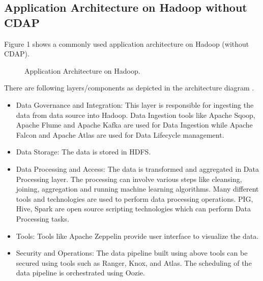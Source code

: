 \documentclass[9pt,twocolumn,twoside]{../../styles/osajnl}
\begin{document}
\subsection{Application Architecture on Hadoop without CDAP}
Figure 1 \cite{www-hdp-dataplatform} shows a commonly used application
architecture on Hadoop (without CDAP).


\begin{figure}[htbp]
\centering
{}
\caption{Application Architecture on Hadoop.}
\label{fig:hadoop-arch}
\end{figure}

There are following layers/components as depicted in the architecture diagram
\cite{www-hdp-dataplatform}.

\begin{itemize}
\item Data Governance and Integration: This layer is responsible for ingesting
the data from data source into Hadoop. Data Ingestion tools like Apache
Sqoop, Apache Flume and Apache Kafka are used for Data Ingestion while Apache
Falcon and Apache Atlas are used for Data Lifecycle management.
\item Data Storage: The data is stored in HDFS.
\item Data Processing and Access: The data is transformed and aggregated in
Data Processing layer. The processing can involve various steps like cleansing,
joining, aggregation and running machine learning algorithms. Many different
tools and technologies are used to perform data processing operations.
PIG, Hive, Spark are open source scripting technologies which can perform
Data Processing tasks.
\item Tools: Tools like Apache Zeppelin provide user interface to visualize
the data.
\item Security and Operations: The data pipeline built using above tools can
 be secured using tools such as Ranger, Knox, and Atlas. The scheduling of
 the data pipeline is orchestrated using Oozie.
\end{itemize}
\end{document}

